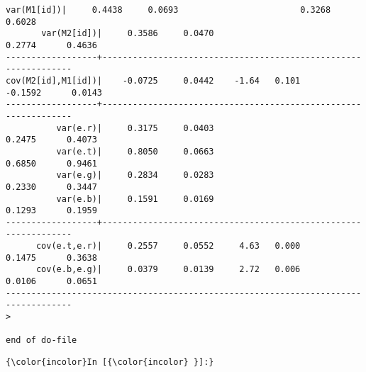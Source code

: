 \documentclass[11pt]{article}
\begin{document}
\begin{Verbatim}[commandchars=\\\{\}]
       var(M1[id])|     0.4438     0.0693                        0.3268      0.6028
       var(M2[id])|     0.3586     0.0470                        0.2774      0.4636
------------------+----------------------------------------------------------------
cov(M2[id],M1[id])|    -0.0725     0.0442    -1.64   0.101      -0.1592      0.0143
------------------+----------------------------------------------------------------
          var(e.r)|     0.3175     0.0403                        0.2475      0.4073
          var(e.t)|     0.8050     0.0663                        0.6850      0.9461
          var(e.g)|     0.2834     0.0283                        0.2330      0.3447
          var(e.b)|     0.1591     0.0169                        0.1293      0.1959
------------------+----------------------------------------------------------------
      cov(e.t,e.r)|     0.2557     0.0552     4.63   0.000       0.1475      0.3638
      cov(e.b,e.g)|     0.0379     0.0139     2.72   0.006       0.0106      0.0651
-----------------------------------------------------------------------------------
> 

end of do-file

    \end{Verbatim}

    \begin{Verbatim}[commandchars=\\\{\}]
{\color{incolor}In [{\color{incolor} }]:} 
\end{Verbatim}



    
    
    
    
\end{document}
